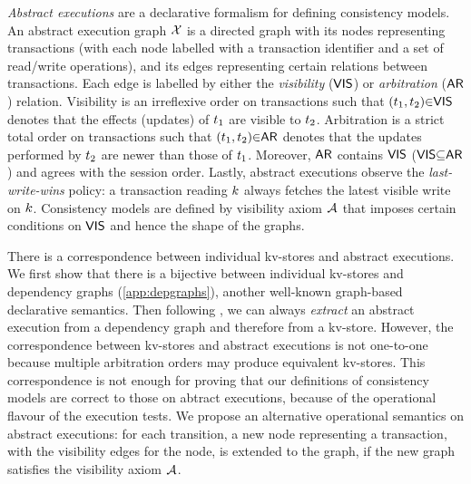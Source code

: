 

\emph{Abstract executions} \cite{ev_transactions,framework-concur} are a declarative formalism for defining consistency models. 
An abstract execution graph $\mathcal{X}$ is a directed graph with its nodes representing transactions 
(with each node labelled with a transaction identifier and a set of read/write operations), 
and its edges representing certain relations between transactions. 
Each edge is labelled by either the \emph{visibility} ($\mathsf{VIS}$) or \emph{arbitration} ($\mathsf{AR}$) relation. 
Visibility is an irreflexive order on transactions such that $(t_1,t_2) {\in} \mathsf{VIS}$ denotes that the effects (updates) of $t_1$ are visible to $t_2$. 
Arbitration is a strict total order on transactions such that $(t_1,t_2) {\in} \mathsf{AR}$ denotes that the updates performed by $t_2$ are newer than those of $t_1$. 
Moreover, $\mathsf{AR}$ contains $\mathsf{VIS}$ ($\mathsf{VIS} {\subseteq} \mathsf{AR}$) and agrees with the session order.
Lastly, abstract executions observe the \emph{last-write-wins} policy: 
a transaction reading $k$ always fetches the latest visible write on $k$.
Consistency models are defined by visibility axiom \( \visaxioms\) 
that imposes certain conditions on $\mathsf{VIS}$ and hence the shape of the graphs.

There is a correspondence between individual kv-stores and abstract executions.
We first show that there is a bijective between individual kv-stores and dependency graphs (\cref{app:depgraphs}),
another well-known graph-based declarative semantics.
Then following \cite{laws}, we can always \emph{extract} an abstract execution
from a dependency graph and therefore from a kv-store.
However, the correspondence between kv-stores and abstract executions is not one-to-one 
because multiple arbitration orders may produce equivalent kv-stores.
This correspondence is not enough for proving that 
our definitions of consistency models are correct to those on abtract executions, 
because of the operational flavour of the execution tests.
We propose an alternative operational semantics on abstract executions:
for each transition, 
a new node representing a transaction, with the visibility edges for the node,
is extended to the graph, if the new graph satisfies the visibility axiom \( \visaxioms \).

